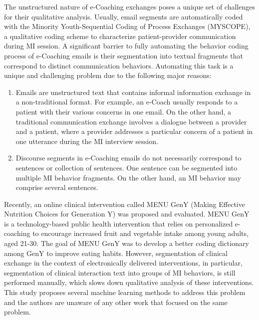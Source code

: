 \documentclass{amia}
\begin{document}
The unstructured nature of e-Coaching exchanges poses a unique set of challenges for their qualitative analysis. Usually, email segments are automatically coded with the Minority Youth-Sequential Coding of Process Exchanges (MYSCOPE), \cite{carcone2013provider} a qualitative coding scheme to characterize patient-provider communication during MI session. A significant barrier to fully automating the behavior coding process of e-Coaching emails is their segmentation into textual fragments that correspond to distinct communication behaviors. Automating this task is a unique and challenging problem due to the following major reasons:

\begin{enumerate}
\item Emails are unstructured text that contains informal information exchange in a non-traditional format. For example, an e-Coach usually responds to a patient with their various concerns in one email. On the other hand, a traditional communication exchange involves a dialogue between a provider and a patient, where a provider addresses a particular concern of a patient in one utterance during the MI interview session. 
\item Discourse segments in e-Coaching emails do not necessarily correspond to sentences or collection of sentences. One sentence can be segmented into multiple MI behavior fragments. On the other hand, an MI behavior may comprise several sentences.
\end{enumerate}

Recently, an online clinical intervention called MENU GenY (Making Effective Nutrition Choices for Generation Y) was proposed and evaluated. \cite{alexander2017motivations} MENU GenY is a technology-based public health intervention that relies on personalized e-coaching to encourage increased fruit and vegetable intake among young adults, aged 21-30. The goal of MENU GenY was to develop a better coding dictionary among GenY to improve eating habits. However, segmentation of clinical exchange in the context of electronically delivered interventions, in particular, segmentation of clinical interaction text into groups of MI behaviors, is still performed manually, which slows down qualitative analysis of these interventions. This study proposes several machine learning methods to address this problem and the authors are unaware of any other work that focused on the same problem.
\end{document}

